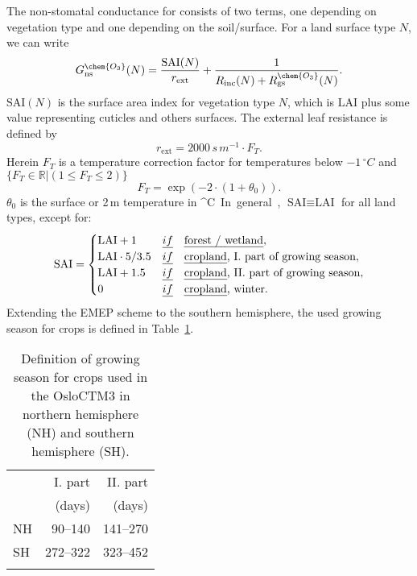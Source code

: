 \documentclass[gmd, manuscript]{copernicus}
\begin{document}
The non-stomatal conductance for  consists of two terms, one depending on vegetation type and one depending on the soil/surface. For a land surface type $N$, we can write
\begin{equation}
  G_\text{ns}^\chem{O_3}(N) = \frac{\text{SAI}(N)}{r_\text{ext}} + \frac{1}{R_\text{inc}(N) + R_\text{gs}^\chem{O_3}(N)}.
  \label{eq:non-stomata-cond}
\end{equation}
$\text{SAI}(N)$ is the surface area index for vegetation type $N$, which is $\text{LAI}$ plus some value representing cuticles and others surfaces. The external leaf resistance is defined by
\begin{equation}
  r_\text{ext} = 2000\,\unit{s\,m^{-1}}\cdot F_T.
\end{equation}
Herein $F_T$ is a temperature correction factor for temperatures below $-1\,\unit{^\circ C}$ and $\{F_T \in \mathbb{R} | (1 \leq F_T \leq 2)\}$
\begin{equation}
  F_T = \exp{(-2\cdot(1+\theta_0))}.
\end{equation}
$\theta_0$ is the surface or 2\,\unit{m} temperature in \unit{^\circ C}. In general, $\text{SAI} \equiv \text{LAI}$ for all land types, except for: 
%
\begin{equation}
  \text{SAI} = 
  \begin{cases}
    \text{LAI}+1 & \emph{if} \quad \text{\emph{forest / wetland}},\\
    \text{LAI}\cdot 5/3.5 & \emph{if} \quad \text{\emph{cropland}, I. part of growing season},\\
    \text{LAI} + 1.5 & \emph{if} \quad \text{\emph{cropland}, II. part of growing season},\\
    0 & \emph{if} \quad \text{\emph{cropland}, winter}.
  \end{cases}
  \label{eq:SAI}
\end{equation}
%
Extending the EMEP scheme to the southern hemisphere, the used growing season for crops is defined in Table~\ref{tab:growing_season}.
%
\begin{table}[t]
  \caption{Definition of growing season for crops used in the OsloCTM3 in northern hemisphere (NH) and southern hemisphere (SH).}
  \begin{tabular}{lrr}
    \tophline
    & I. part & II. part \\
    & (days) & (days) \\
    \middlehline
    NH & 90--140 & 141--270 \\
    SH & 272--322 & 323--452 \\
    \bottomhline
  \end{tabular}
  \label{tab:growing_season}
\end{table}
%
\end{document}

